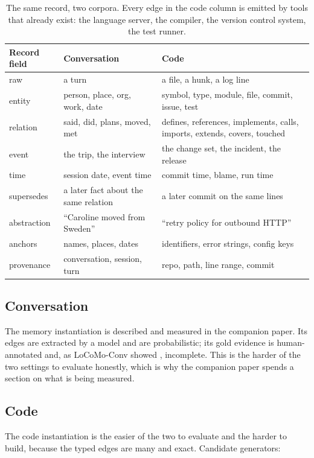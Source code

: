 \documentclass[11pt]{article}
\begin{document}
\begin{table}[t]
\centering
\footnotesize
\begin{tabular}{p{24mm}p{58mm}p{74mm}}
\toprule
Record field & Conversation & Code \\
\midrule
raw & a turn & a file, a hunk, a log line \\
entity & person, place, org, work, date & symbol, type, module, file, commit, issue, test \\
relation & said, did, plans, moved, met & defines, references, implements, calls, imports, extends, covers, touched \\
event & the trip, the interview & the change set, the incident, the release \\
time & session date, event time & commit time, blame, run time \\
supersedes & a later fact about the same relation & a later commit on the same lines \\
abstraction & ``Caroline moved from Sweden'' & ``retry policy for outbound HTTP'' \\
anchors & names, places, dates & identifiers, error strings, config keys \\
provenance & conversation, session, turn & repo, path, line range, commit \\
\bottomrule
\end{tabular}
\caption{The same record, two corpora. Every edge in the code column is
emitted by tools that already exist: the language server, the compiler,
the version control system, the test runner.}
\label{tab:two}
\end{table}

\subsection{Conversation}

The memory instantiation is described and measured in the companion paper.
Its edges are extracted by a model and are probabilistic; its gold evidence
is human-annotated and, as LoCoMo-Conv showed \cite{locomoconv},
incomplete. This is the harder of the two settings to evaluate honestly,
which is why the companion paper spends a section on what is being measured.

\subsection{Code}

The code instantiation is the easier of the two to evaluate and the harder
to build, because the typed edges are many and exact. Candidate generators:
\end{document}
